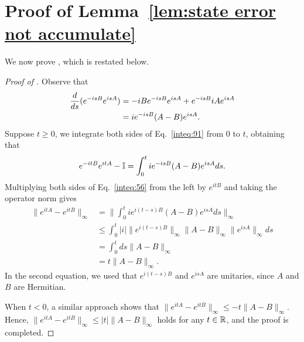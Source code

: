 \section{Proof of \texorpdfstring{Lemma~\ref{lem:state error not accumulate}}{Lemma~\ref{lem:state error not accumulate}}}


\label{sec:appendix error not accumulate}





We now prove , which is restated below.

\lemrobstexp*


\begin{proof}[Proof of ]

Observe that
\begin{align}
    \frac{d}{ds}(e^{-isB}e^{isA}) 
    &= -iBe^{-isB}e^{isA} + e^{-isB}iAe^{isA} \\
    \label{inteq:91}
    &=ie^{-isB}(A-B)e^{isA}.
\end{align}
Suppose $t \geq 0$, we integrate both sides of Eq.~\eqref{inteq:91} from $0$ to $t$, obtaining that
\begin{align}
\label{inteq:56}
    e^{-itB}e^{itA} - \mathbb{I} = \int_0^t ie^{-isB}(A-B)e^{isA} ds.
\end{align}
Multiplying both sides of Eq.~\eqref{inteq:56} from the left by $e^{itB}$ and taking the operator norm gives
\begin{align}
    \big\|e^{itA} - e^{itB}\big\|_\infty 
    &= \Big\|\int_0^t ie^{i(t-s)B}(A-B)e^{isA} ds\Big\|_\infty \\
    &\leq \int_0^t |i|\big\|e^{i(t-s)B}\big\|_\infty \|A-B\|_\infty\big\|e^{isA}\big\|_\infty ds \\
    &= \int_0^t ds \|A-B\|_\infty \\
    &= t \|A-B\|_\infty.
\end{align}
In the second equation, we used that $e^{i(t-s)B}$ and $e^{isA}$ are unitaries, since $A$ and $B$ are Hermitian.

When $t < 0$, a similar approach shows that $\big\|e^{itA} - e^{itB}\big\|_\infty \leq -t\|A-B\|_\infty$.
Hence, $\big\|e^{itA} - e^{itB}\big\|_\infty \leq |t|\|A-B\|_\infty$ holds for any $t \in \mathbb{R}$, and the proof is completed.



\end{proof}







